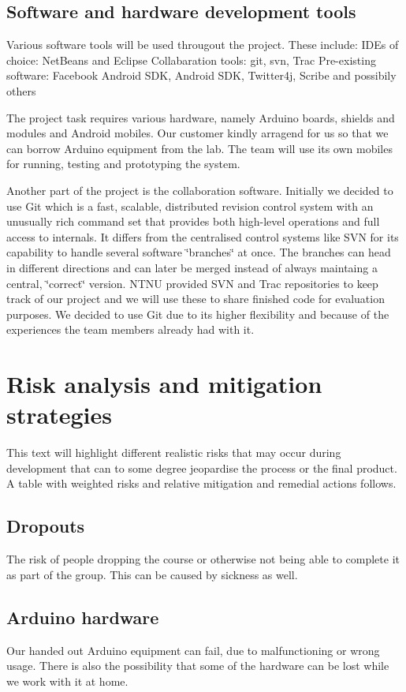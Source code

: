 \subsection{Software and hardware development tools}
Various software tools will be used througout the project. These include:
IDEs of choice: NetBeans and Eclipse
Collabaration tools: git, svn, Trac
Pre-existing software: Facebook Android SDK, Android SDK, Twitter4j, Scribe and possibily others

The project task requires various hardware, namely Arduino boards, shields and modules and Android mobiles. Our customer kindly arragend for us so that we can borrow Arduino equipment from the lab. The team will use its own
mobiles for running, testing and prototyping the system.
	
Another part of the project is the collaboration software.
Initially we decided to use Git which is a fast, scalable,
distributed revision control system with an unusually rich command
set that provides both high-level operations and full access to internals.
It differs from the centralised control systems like SVN for its capability
to handle several software \char`\"{}branches\char`\"{} at once. The
branches can head in different directions and can later be merged
instead of always maintaing a central, \char`\"{}correct\char`\"{}
version. NTNU provided SVN and Trac repositories to keep track of our
project and we will use these to share finished code for evaluation
purposes. We decided to use Git due to its higher flexibility and because
of the experiences the team members already had with it.

\newpage
\section{Risk analysis and mitigation strategies}

This text will highlight different realistic risks that may occur during development
that can to some degree jeopardise the process or the final product.
A table with weighted risks and relative mitigation and remedial actions follows.

\subsection{Dropouts}
The risk of people dropping the course or otherwise not being able to complete it as part
of the group. This can be caused by sickness as well.

\subsection{Arduino hardware}
Our handed out Arduino equipment can fail, due to malfunctioning or wrong usage.
There is also the possibility that some of the hardware can be lost while we work with it at home.

